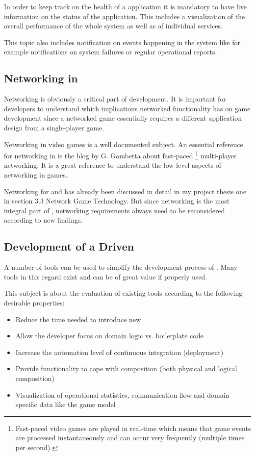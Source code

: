 In order to keep track on the health of a \ms{} application it is mandatory to
have live information on the status of the application. This includes a
visualization of the overall performance of the whole system as well as of
individual services.

This topic also includes notification on events happening in the system like for
example notifications on system failures or regular operational reports. 

\subsection{Networking in \ogsucuc{}}
\label{sub:networking_in_online_games}

Networking is obviously a critical part of \og{} development. It is important
for developers to understand which implications networked functionality has on
game development since a networked game essentially requires a different
application design from a single-player game. 

Networking in video games is a well documented subject. An essential reference
for networking in \ogs{} is the blog by G. Gambetta \cite{gambetta_fast_paced}
about fast-paced \footnote{Fast-paced video games are played in real-time which
means that game events are processed instantaneously and can occur very
frequently (multiple times per second).} multi-player networking.
It is a great reference to understand the low level aspects of networking in games.

Networking for \mss{} and \ogs{} has already been discussed in detail in my
project thesis one \cite{biedermann2015project1} in  section 3.3 Network Game
Technology. But since networking is the most integral part of \ogs{}, networking
requirements always need to be reconsidered according to new findings.


\subsection{Development of a \msuc{} Driven \ogucuc{}}

A number of tools can be used to simplify the development process of \mss{}.
Many tools in this regard exist and can be of great value if properly used.

This subject is about the evaluation of existing tools according to the
following desirable properties:

\begin{itemize}
  \item Reduce the time needed to introduce new \mss{}
  \item Allow the developer focus on domain logic vs. boilerplate code
  \item Increase the automation level of continuous integration (deployment)
  \item Provide functionality to cope with \mss{} composition (both physical
  and logical composition)
  \item Visualization of operational statistics, communication flow and domain
  specific data like the game model
\end{itemize}

